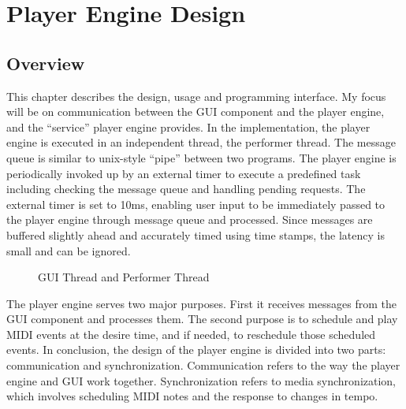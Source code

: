 
\chapter{Player Engine Design} %

\section{Overview}
This chapter describes the design, usage and programming interface. My focus 
will be on communication between the GUI component and the player engine, and 
the ``service'' player engine provides. In the implementation, the player 
engine is executed in an independent thread, the performer thread. The 
message queue is similar to unix-style ``pipe'' between two programs. The 
player engine is periodically invoked up by an external timer to 
execute a predefined task including checking the message queue and handling 
pending requests. The external timer is set to 10ms, enabling user 
input to be immediately passed to the player engine through message queue and 
processed. Since messages are buffered slightly ahead and accurately timed 
using time stamps, the latency is small and can be ignored.

\begin{figure}[H]
\caption{GUI Thread and Performer Thread}
\end{figure}

The player engine serves two major purposes. First it receives
messages from the GUI component and processes them. The second purpose is to 
schedule and play MIDI events at the desire time, and if needed, to
reschedule those scheduled events. In conclusion, the design of the player 
engine is divided into two parts: communication and synchronization. 
Communication refers to the way the player engine and GUI work together. 
Synchronization refers to media synchronization, which involves scheduling 
MIDI notes and the response to changes in tempo. 

